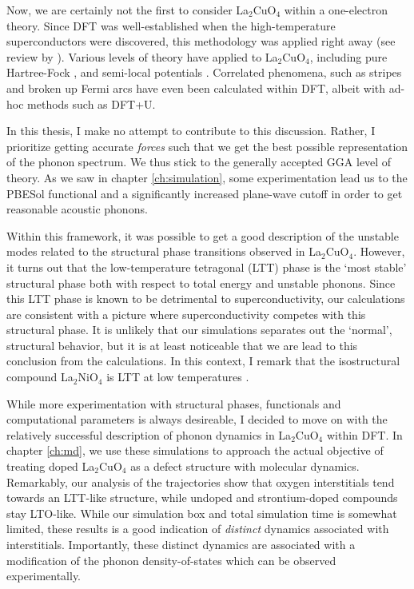 Now, we are certainly not the first to consider La$_2$CuO$_4$ within a one-electron theory. Since DFT was well-established when the high-temperature superconductors were discovered, this methodology was applied right away (see review by \citeauthor{Pickett1989} \cite{Pickett1989}). Various levels of theory have applied to La$_2$CuO$_4$, including pure Hartree-Fock \cite{Su1999}, and semi-local potentials \cite{Lane2018}. Correlated phenomena, such as stripes \cite{Anisimov2004} and broken up Fermi arcs \cite{Lazic2015, Lazic2015a} have even been calculated within DFT, albeit with ad-hoc methods such as DFT+U. 

In this thesis, I make no attempt to contribute to this discussion. Rather, I prioritize getting accurate \emph{forces} such that we get the best possible representation of the phonon spectrum. We thus stick to the generally accepted GGA level of theory. As we saw in chapter \ref{ch:simulation}, some experimentation lead us to the PBESol functional and a significantly increased plane-wave cutoff in order to get reasonable acoustic phonons. 

Within this framework, it was possible to get a good description of the unstable modes related to the structural phase transitions observed in La$_2$CuO$_4$. However, it turns out that the low-temperature tetragonal (LTT) phase is the `most stable' structural phase both with respect to total energy and unstable phonons. Since this LTT phase is known to be detrimental to superconductivity, our calculations are consistent with a picture where superconductivity competes with this structural phase. It is unlikely that our simulations separates out the `normal', structural behavior, but it is at least noticeable that we are lead to this conclusion from the calculations. In this context, I remark that the isostructural compound La$_2$NiO$_4$ is LTT at low temperatures \cite{Tranquada1994}.

While more experimentation with structural phases, functionals and computational parameters is always desireable, I decided to move on with the relatively successful description of phonon dynamics in La$_2$CuO$_4$ within DFT. In chapter \ref{ch:md}, we use these simulations to approach the actual objective of treating doped La$_2$CuO$_4$ as a defect structure with molecular dynamics. Remarkably, our analysis of the trajectories show that oxygen interstitials tend towards an LTT-like structure, while undoped and strontium-doped compounds stay LTO-like. While our simulation box and total simulation time is somewhat limited, these results is a good indication of \emph{distinct} dynamics associated with interstitials. Importantly, these distinct dynamics are associated with a modification of the phonon density-of-states which can be observed experimentally.

